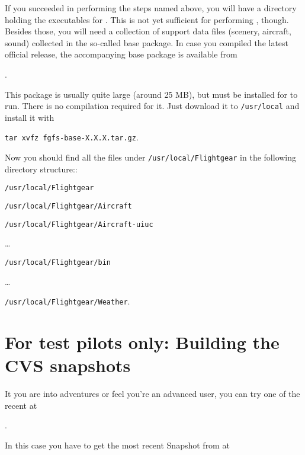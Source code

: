 If you succeeded in performing the steps named above, you will have a directory holding the
executables for \FlightGear{}$\!$. This is not yet sufficient for performing
\FlightGear{}$\!$, though. Besides those, you will need a collection of support data
files (scenery, aircraft, sound) collected in the so-called base package. In case you
compiled the latest official release, the accompanying base package is available from
 \medskip

.

This package is usually quite large (around 25 MB), but
must be installed for \FlightGear{} to run. There is no compilation required for it. Just download it to \texttt{/usr/local} and install it with
 \medskip

    \texttt{tar xvfz fgfs-base-X.X.X.tar.gz}.

 \noindent
Now you should find all the \FlightGear{} files under \texttt{/usr/local/Flightgear} in the
following directory structure::
\medskip

 \texttt{/usr/local/Flightgear}

 \texttt{/usr/local/Flightgear/Aircraft}

 \texttt{/usr/local/Flightgear/Aircraft-uiuc}

 \ldots

 \texttt{/usr/local/Flightgear/bin}

 \ldots

 \texttt{/usr/local/Flightgear/Weather}.


\section{For test pilots only: Building the CVS snapshots}

It you are into adventures or feel you're an advanced user, you can try one of the recent  at
  \medskip

.
 \medskip

 \noindent
In this case you have to get the most recent Snapshot from \SimGear{} at
 \medskip

 \medskip

